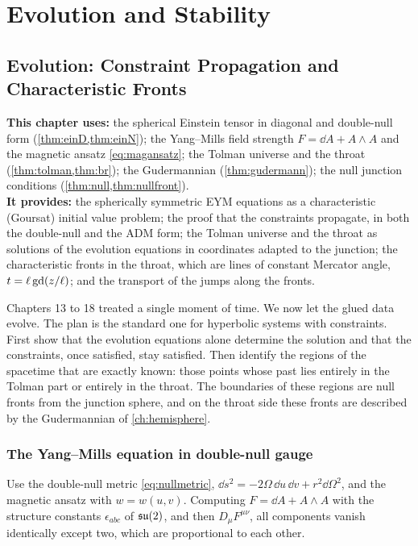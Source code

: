 \part{Evolution and Stability}
\chapter{Evolution: Constraint Propagation and Characteristic Fronts}
\label{ch:evolution}

\begin{usesbox}
\textbf{This chapter uses:} the spherical Einstein tensor in diagonal and double-null form (\cref{thm:einD,thm:einN}); the Yang--Mills field strength $F=\dd A+A\wedge A$ and the magnetic ansatz \eqref{eq:magansatz}; the Tolman universe and the throat (\cref{thm:tolman,thm:br}); the Gudermannian (\cref{thm:gudermann}); the null junction conditions (\cref{thm:null,thm:nullfront}).\\
\textbf{It provides:} the spherically symmetric EYM equations as a characteristic (Goursat) initial value problem; the proof that the constraints propagate, in both the double-null and the ADM form; the Tolman universe and the throat as solutions of the evolution equations in coordinates adapted to the junction; the characteristic fronts in the throat, which are lines of constant Mercator angle, $t=\ell\operatorname{gd}(z/\ell)$; and the transport of the jumps along the fronts.
\end{usesbox}

Chapters 13 to 18 treated a single moment of time. We now let the glued data evolve. The plan is the standard one for hyperbolic systems with constraints. First show that the evolution equations alone determine the solution and that the constraints, once satisfied, stay satisfied. Then identify the regions of the spacetime that are exactly known: those points whose past lies entirely in the Tolman part or entirely in the throat. The boundaries of these regions are null fronts from the junction sphere, and on the throat side these fronts are described by the Gudermannian of \cref{ch:hemisphere}.

\section{The Yang--Mills equation in double-null gauge}

Use the double-null metric \eqref{eq:nullmetric}, $\dd s^2=-2\Omega\,\dd u\,\dd v+r^2\dd\Omega^2$, and the magnetic ansatz with $w=w(u,v)$. Computing $F=\dd A+A\wedge A$ with the structure constants $\epsilon_{abc}$ of $\mathfrak{su}(2)$, and then $D_\mu F^{\mu\nu}$, all components vanish identically except two, which are proportional to each other.

